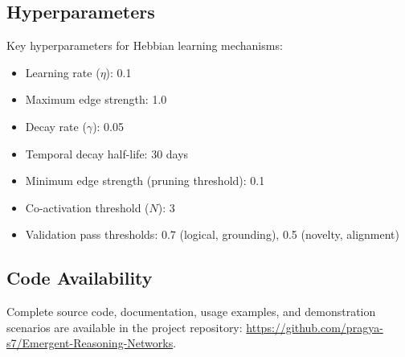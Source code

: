 \documentclass{article}
\begin{document}
\subsection{Hyperparameters}

Key hyperparameters for Hebbian learning mechanisms:
\begin{itemize}
\item Learning rate ($\eta$): 0.1
\item Maximum edge strength: 1.0
\item Decay rate ($\gamma$): 0.05
\item Temporal decay half-life: 30 days
\item Minimum edge strength (pruning threshold): 0.1
\item Co-activation threshold ($N$): 3
\item Validation pass thresholds: 0.7 (logical, grounding), 0.5 (novelty, alignment)
\end{itemize}

\subsection{Code Availability}

Complete source code, documentation, usage examples, and demonstration scenarios are available in the project repository: \url{https://github.com/pragya-s7/Emergent-Reasoning-Networks}.
\end{document}
